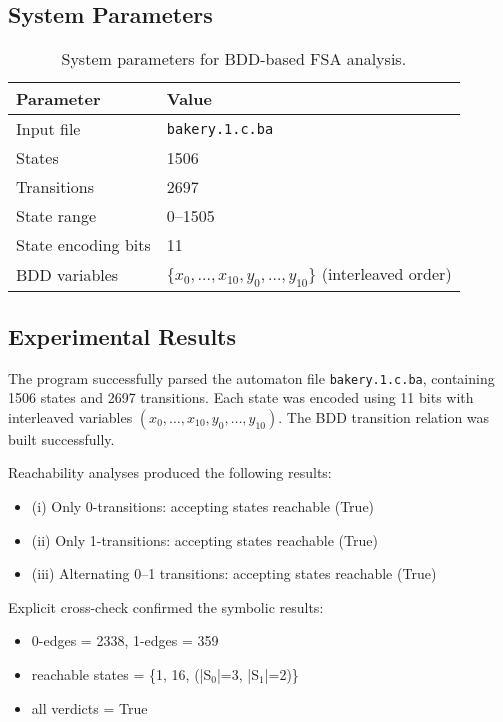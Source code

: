 \documentclass[a4paper,11pt]{article}
\begin{document}
\subsection*{System Parameters}

\begin{table}[h]
\centering
\begin{tabular}{l|l}
\textbf{Parameter} & \textbf{Value} \\\hline
Input file & \texttt{bakery.1.c.ba} \\
States & 1506 \\
Transitions & 2697 \\
State range & 0--1505 \\
State encoding bits & 11 \\
BDD variables & $\{x_0,\dots,x_{10},y_0,\dots,y_{10}\}$ (interleaved order) \\
\end{tabular}
\caption{System parameters for BDD-based FSA analysis.}
\end{table}



\subsection*{Experimental Results}

The program successfully parsed the automaton file \texttt{bakery.1.c.ba},
containing 1506 states and 2697 transitions.
Each state was encoded using 11 bits with interleaved variables
\((x_0,\dots,x_{10},y_0,\dots,y_{10})\).
The BDD transition relation was built successfully.

Reachability analyses produced the following results:

\begin{itemize}
  \item (i) Only 0-transitions: accepting states reachable (True)
  \item (ii) Only 1-transitions: accepting states reachable (True)
  \item (iii) Alternating 0–1 transitions: accepting states reachable (True)
\end{itemize}

Explicit cross-check confirmed the symbolic results:
\begin{itemize}
  \item 0-edges = 2338, 1-edges = 359
  \item reachable states = \{1, 16, (|S$_0$|=3, |S$_1$|=2)\}
  \item all verdicts = True
\end{itemize}
\end{document}
